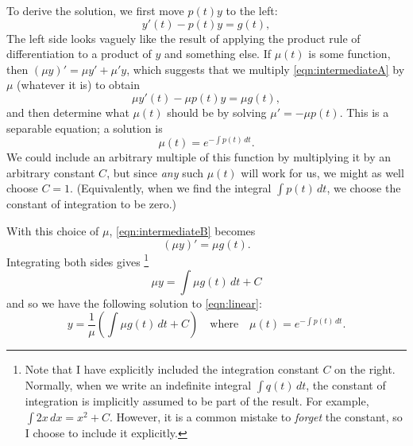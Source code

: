 To derive the solution, we first move $p(t)y$ to the left:
\begin{equation}
    y'(t) - p(t) y =  g(t),
\label{eqn:intermediateA}
\end{equation}
The left side looks vaguely like the result of applying the
product rule of differentiation to a product of $y$ and something else.
If $\mu(t)$ is some function, then $(\mu y)' = \mu y' + \mu' y$,
which suggests that we multiply \eqref{eqn:intermediateA}
by $\mu$ (whatever it is)
to obtain
\begin{equation}
    \mu y'(t) - \mu p(t) y =  \mu g(t),
\label{eqn:intermediateB}
\end{equation}
and then determine what $\mu(t)$ should
be by solving $\mu' = -\mu p(t)$.
This is a separable equation; a solution is
\begin{equation}
   \mu(t) = e^{-\int p(t)\, dt}.
\end{equation}
We could include an arbitrary multiple of this function
by multiplying it by an arbitrary constant $C$, but
since \emph{any} such $\mu(t)$ will work for us, we
might as well choose $C=1$.
(Equivalently, when we find the integral
$\int p(t)\,dt$, we choose the constant of integration
to be zero.)

With this choice of $\mu$, 
\eqref{eqn:intermediateB} becomes
\begin{equation}
    (\mu y)' =  \mu g(t).
\label{eqn:intermediateC}
\end{equation}
Integrating both sides gives%
\footnote{Note that I have explicitly included the integration
constant $C$ on the right.  Normally, when we write an indefinite
integral $\int q(t)\, dt$, the constant of integration is implicitly
assumed to be part of the result. For example, $\int 2x\,dx = x^2+C$.
However, it is a common mistake to \emph{forget} the constant, so
I choose to include it explicitly.}
\begin{equation}
    \mu y =  \int \mu g(t) \, dt + C
\label{eqn:intermediateD}
\end{equation}
and so we have the following solution
to \eqref{eqn:linear}:
\begin{equation}
    y =  \frac{1}{\mu}\left(\int \mu g(t) \, dt + C\right)
    \quad \textrm{where} \quad
    \mu(t) = e^{-\int p(t)\, dt}.
\label{eqn:linearsolution}
\end{equation}

